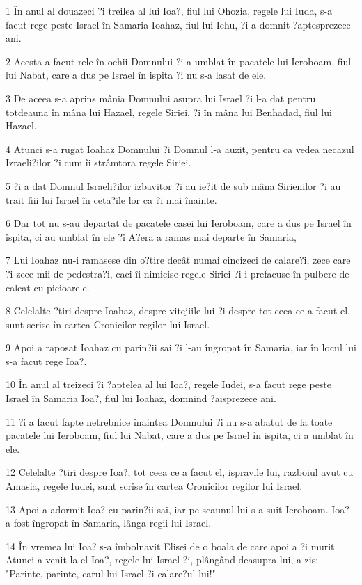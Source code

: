\par 1 În anul al douazeci ?i treilea al lui Ioa?, fiul lui Ohozia, regele lui Iuda, s-a facut rege peste Israel în Samaria Ioahaz, fiul lui Iehu, ?i a domnit ?aptesprezece ani.
\par 2 Acesta a facut rele în ochii Domnului ?i a umblat în pacatele lui Ieroboam, fiul lui Nabat, care a dus pe Israel în ispita ?i nu s-a lasat de ele.
\par 3 De aceea s-a aprins mânia Domnului asupra lui Israel ?i l-a dat pentru totdeauna în mâna lui Hazael, regele Siriei, ?i în mâna lui Benhadad, fiul lui Hazael.
\par 4 Atunci s-a rugat Ioahaz Domnului ?i Domnul l-a auzit, pentru ca vedea necazul Izraeli?ilor ?i cum îi strâmtora regele Siriei.
\par 5 ?i a dat Domnul Israeli?ilor izbavitor ?i au ie?it de sub mâna Sirienilor ?i au trait fiii lui Israel în ceta?ile lor ca ?i mai înainte.
\par 6 Dar tot nu s-au departat de pacatele casei lui Ieroboam, care a dus pe Israel în ispita, ci au umblat în ele ?i A?era a ramas mai departe în Samaria,
\par 7 Lui Ioahaz nu-i ramasese din o?tire decât numai cincizeci de calare?i, zece care ?i zece mii de pedestra?i, caci îi nimicise regele Siriei ?i-i prefacuse în pulbere de calcat cu picioarele.
\par 8 Celelalte ?tiri despre Ioahaz, despre vitejiile lui ?i despre tot ceea ce a facut el, sunt scrise în cartea Cronicilor regilor lui Israel.
\par 9 Apoi a raposat Ioahaz cu parin?ii sai ?i l-au îngropat în Samaria, iar în locul lui s-a facut rege Ioa?.
\par 10 În anul al treizeci ?i ?aptelea al lui Ioa?, regele Iudei, s-a facut rege peste Israel în Samaria Ioa?, fiul lui Ioahaz, domnind ?aisprezece ani.
\par 11 ?i a facut fapte netrebnice înaintea Domnului ?i nu s-a abatut de la toate pacatele lui Ieroboam, fiul lui Nabat, care a dus pe Israel în ispita, ci a umblat în ele.
\par 12 Celelalte ?tiri despre Ioa?, tot ceea ce a facut el, ispravile lui, razboiul avut cu Amasia, regele Iudei, sunt scrise în cartea Cronicilor regilor lui Israel.
\par 13 Apoi a adormit Ioa? cu parin?ii sai, iar pe scaunul lui s-a suit Ieroboam. Ioa? a fost îngropat în Samaria, lânga regii lui Israel.
\par 14 În vremea lui Ioa? s-a îmbolnavit Elisei de o boala de care apoi a ?i murit. Atunci a venit la el Ioa?, regele lui Israel ?i, plângând deasupra lui, a zis: "Parinte, parinte, carul lui Israel ?i calare?ul lui!"
